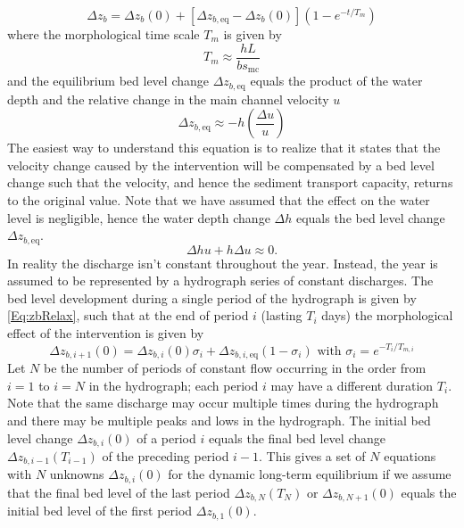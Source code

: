 %
\begin{equation}
\Delta z_b = \Delta z_b (0) + [\Delta z_{b,\text{eq}} - \Delta z_b(0)](1 - e^{-t/T_m})
\label{Eq:zbRelax}
\end{equation}
%
where the morphological time scale $T_m$ is given by
%
\begin{equation}
T_m \approx \frac{h L}{b s_\text{mc}}
\label{Eq:MorTimeScale}
\end{equation}
%
and the equilibrium bed level change $\Delta z_{b,\text{eq}}$ equals the product of the water depth and the relative change in the main channel velocity $u$ 
%
\begin{equation}
\Delta z_{b,\text{eq}} \approx -h \left ( \frac{\Delta u}{u} \right )
\label{Eq:zbEqui}
\end{equation}
%
The easiest way to understand this equation is to realize that it states that the velocity change caused by the intervention will be compensated by a bed level change such that the velocity, and hence the sediment transport capacity, returns to the original value.
Note that we have assumed that the effect on the water level is negligible, hence the water depth change $\Delta h$ equals the bed level change $\Delta z_{b,\text{eq}}$.
%
\begin{equation}
\Delta h u + h \Delta u \approx 0.
\label{Eq:zbEqui2}
\end{equation}
%
In reality the discharge isn't constant throughout the year.
Instead, the year is assumed to be represented by a hydrograph series of constant discharges.
The bed level development during a single period of the hydrograph is given by \autoref{Eq:zbRelax}, such that at the end of period $i$ (lasting $T_i$ days) the morphological effect of the intervention is given by
%
\begin{equation}
\Delta z_{b,i+1}(0) = \Delta z_{b,i} (0) \sigma_i + \Delta z_{b,i,\text{eq}} (1-\sigma_i) \text{ with } \sigma_i = e^{-T_i/T_{m,i}}
\label{Eq:zbOverTime}
\end{equation}
%
Let $N$ be the number of periods of constant flow occurring in the order from $i=1$ to $i=N$ in the hydrograph; each period $i$ may have a different duration $T_i$.
Note that the same discharge may occur multiple times during the hydrograph and there may be multiple peaks and lows in the hydrograph.
The initial bed level change $\Delta z_{b,i}(0)$ of a period $i$ equals the final bed level change $\Delta z_{b,i-1}(T_{i-1})$ of the preceding period $i-1$.
This gives a set of $N$ equations with $N$ unknowns $\Delta z_{b,i}(0)$ for the dynamic long-term equilibrium if we assume that the final bed level of the last period $\Delta z_{b,N}(T_N)$ or $\Delta z_{b,N+1}(0)$ equals the initial bed level of the first period $\Delta z_{b,1}(0)$.
